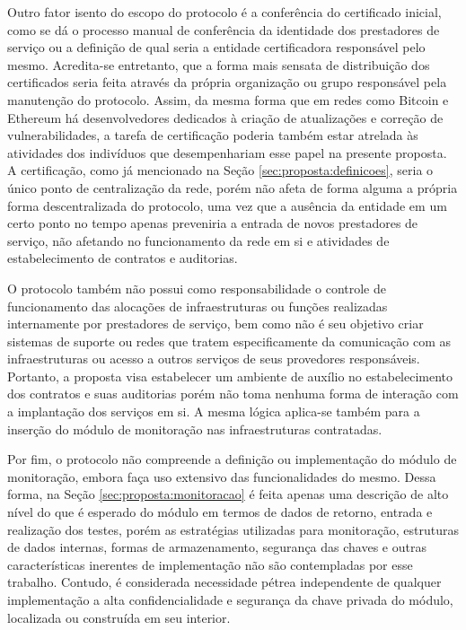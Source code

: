 Outro fator isento do escopo do protocolo é a conferência do certificado inicial, como se dá o processo manual de conferência da identidade dos prestadores de serviço ou a definição de qual seria a entidade certificadora responsável pelo mesmo. Acredita-se entretanto, que a forma mais sensata de distribuição dos certificados seria feita através da própria organização ou grupo responsável pela manutenção do protocolo. Assim, da mesma forma que em redes como Bitcoin e Ethereum há desenvolvedores dedicados à criação de atualizações e correção de vulnerabilidades, a tarefa de certificação poderia também estar atrelada às atividades dos indivíduos que desempenhariam esse papel na presente proposta. A certificação, como já mencionado na Seção \ref{sec:proposta:definicoes}, seria o único ponto de centralização da rede, porém não afeta de forma alguma a própria forma descentralizada do protocolo, uma vez que a ausência da entidade em um certo ponto no tempo apenas preveniria a entrada de novos prestadores de serviço, não afetando no funcionamento da rede em si e atividades de estabelecimento de contratos e auditorias.

O protocolo também não possui como responsabilidade o controle de funcionamento das alocações de infraestruturas ou funções realizadas internamente por prestadores de serviço, bem como não é seu objetivo criar sistemas de suporte ou redes que tratem especificamente da comunicação com as infraestruturas ou acesso a outros serviços de seus provedores responsáveis. Portanto, a proposta visa estabelecer um ambiente de auxílio no estabelecimento dos contratos e suas auditorias porém não toma nenhuma forma de interação com a implantação dos serviços em si. A mesma lógica aplica-se também para a inserção do módulo de monitoração nas infraestruturas contratadas. 

Por fim, o protocolo não compreende a definição ou implementação do módulo de monitoração, embora faça uso extensivo das funcionalidades do mesmo. Dessa forma, na Seção \ref{sec:proposta:monitoracao} é feita apenas uma descrição de alto nível do que é esperado do módulo em termos de dados de retorno, entrada e realização dos testes, porém as estratégias utilizadas para monitoração, estruturas de dados internas, formas de armazenamento, segurança das chaves e outras características inerentes de implementação não são contempladas por esse trabalho. Contudo, é considerada necessidade pétrea independente de qualquer implementação a alta confidencialidade e segurança da chave privada do módulo, localizada ou construída em seu interior. 


